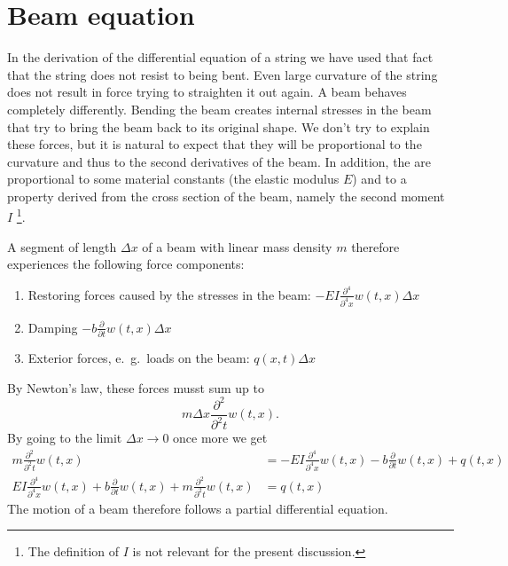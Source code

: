 %
%
%
\section{Beam equation}
In the derivation of the differential equation of a string we
have used that fact that the string does not resist to being
bent.
Even large curvature of the string does not result in force trying
to straighten it out again.
A beam behaves completely differently.
Bending the beam creates internal stresses in the beam that
try to bring the beam back to its original shape.
We don't try to explain these forces, but it is natural to expect that
they will be proportional to the curvature and thus to the second
derivatives of the beam.
In addition, the are proportional to some material constants
(the elastic modulus $E$)
and to a property derived from the cross section of the beam,
namely the second moment $I$%
\footnote{The definition of $I$ is not relevant for the present
discussion.}.

A segment of length $\Delta x$ of a beam with linear mass density $m$
therefore experiences the following force components:
\begin{enumerate}
\item
Restoring forces caused by the stresses in the beam:
$-EI\frac{\partial^4}{\partial^4 x}w(t,x)\Delta x$
\item
Damping
$-b\frac{\partial}{\partial t}w(t,x)\Delta x$
\item
Exterior forces, e.~g.~loads on the beam:
$q(x,t)\Delta x$
\end{enumerate}
By Newton's law, these forces musst sum up to
\[
m\Delta x\frac{\partial^2}{\partial^2 t}w(t,x).
\]
By going to the limit $\Delta x\to 0$ once more we get
\begin{align*}
m\frac{\partial^2}{\partial^2t}w(t,x)
&=-EI\frac{\partial^4}{\partial^4x}w(t,x)-b\frac{\partial}{\partial t}w(t,x)+q(t,x)
\\
EI\frac{\partial^4}{\partial^4x}w(t,x)
+b\frac{\partial}{\partial t}w(t,x)
+m\frac{\partial^2}{\partial^2t}w(t,x)
&=q(t,x)
\end{align*}
The motion of a beam therefore follows a partial differential equation.

